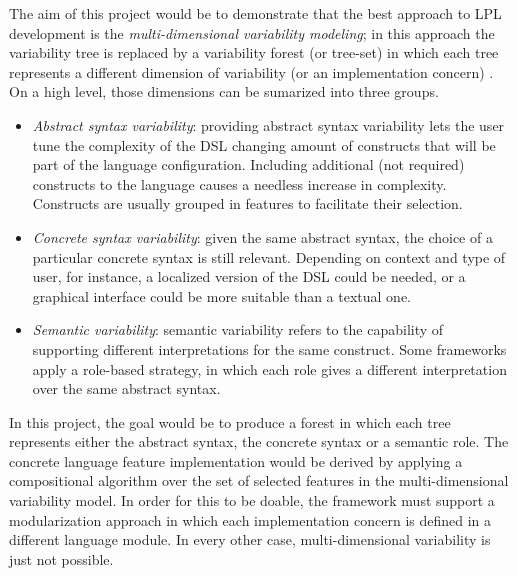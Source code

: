The aim of this project would be to demonstrate that the best approach to LPL development is the \textit{multi-dimensional variability modeling}; in this approach the variability tree is replaced by a variability forest (or tree-set) in which each tree represents a different dimension of variability (or an implementation concern) \cite{Mendez-Acuna16}. On a high level, those dimensions can be sumarized into three groups.
\begin{itemize}
    \item \textit{Abstract syntax variability}: providing abstract syntax variability lets the user tune the complexity of the DSL changing amount of constructs that will be part of the language configuration. Including additional (not required) constructs to the language causes a needless increase in complexity. Constructs are usually grouped in features to facilitate their selection.
    \item \textit{Concrete syntax variability}: given the same abstract syntax, the choice of a particular concrete syntax is still relevant. Depending on context and type of user, for instance, a localized version of the DSL could be needed, or a graphical interface could be more suitable than a textual one.
    \item \textit{Semantic variability}: semantic variability refers to the capability of supporting different interpretations for the same construct. Some frameworks apply a role-based strategy, in which each role gives a different interpretation over the same abstract syntax.
\end{itemize}
In this project, the goal would be to produce a forest in which each tree represents either the abstract syntax, the concrete syntax or a semantic role. The concrete language feature implementation would be derived by applying a compositional algorithm over the set of selected features in the multi-dimensional variability model. In order for this to be doable, the framework must support a modularization approach in which each implementation concern is defined in a different language module. In every other case, multi-dimensional variability is just not possible.

